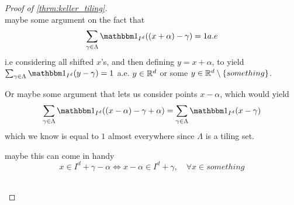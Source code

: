 \documentclass[../thesis.tex]{subfiles}
\begin{document}
\begin{proof}[Proof of \cref{thrm:keller_tiling}]
    \\
    maybe some argument on the fact that 
    \begin{align*}
        \sum_{\gamma \in \Lambda} \indicator{I^d}{(x+\alpha) - \gamma} = 1 a.e 
    \end{align*}
    i.e considering all shifted $x$'s, and then defining $y=x+\alpha$, to yield $\sum_{\gamma \in \Lambda} \indicator{I^d}{y - \gamma} = 1$ a.e. $y\in \mathbb{R}^d$ or some $y\in \mathbb{R}^d\setminus \left\{something\right\}$. 
    
    Or maybe some argument that lets us consider points $x-\alpha$, which would yield
    \begin{align*}
        \sum_{\gamma \in \Lambda} \indicator{I^d}{(x-\alpha) - \gamma + \alpha} = \sum_{\gamma \in \Lambda} \indicator{I^d}{x - \gamma}
    \end{align*}
    which we know is equal to $1$ almost everywhere since $\Lambda$ is a tiling set. 


    maybe this can come in handy
    \begin{equation*}
        x\in I^d + \gamma - \alpha \Longleftrightarrow x-\alpha \in I^d + \gamma,  \quad \forall x\in something
    \end{equation*}

    \\


\end{proof}
\end{document}
